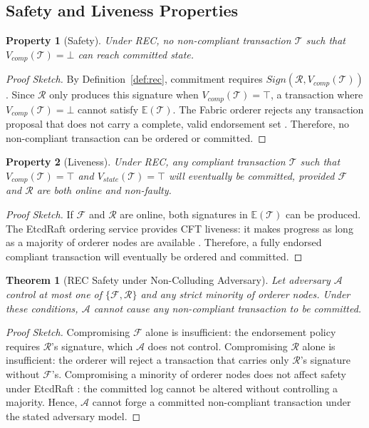 \documentclass[journal,10pt,twocolumn]{IEEEtran}
\newtheorem{theorem}{Theorem}
\newtheorem{property}{Property}
\begin{document}
\subsection{Safety and Liveness Properties}

\begin{property}[Safety]
\label{prop:safety}
Under REC, no non-compliant transaction $\mathcal{T}$ such that $V_{comp}(\mathcal{T}) = \bot$ can reach committed state.
\end{property}

\begin{proof}[Proof Sketch]
By Definition~\ref{def:rec}, commitment requires $\textit{Sign}(\mathcal{R}, V_{comp}(\mathcal{T}))$. Since $\mathcal{R}$ only produces this signature when $V_{comp}(\mathcal{T}) = \top$, a transaction where $V_{comp}(\mathcal{T}) = \bot$ cannot satisfy $\mathbb{E}(\mathcal{T})$. The Fabric orderer rejects any transaction proposal that does not carry a complete, valid endorsement set \cite{ref:fabric}. Therefore, no non-compliant transaction can be ordered or committed.
\end{proof}

\begin{property}[Liveness]
\label{prop:liveness}
Under REC, any compliant transaction $\mathcal{T}$ such that $V_{comp}(\mathcal{T}) = \top$ and $V_{state}(\mathcal{T}) = \top$ will eventually be committed, provided $\mathcal{F}$ and $\mathcal{R}$ are both online and non-faulty.
\end{property}

\begin{proof}[Proof Sketch]
If $\mathcal{F}$ and $\mathcal{R}$ are online, both signatures in $\mathbb{E}(\mathcal{T})$ can be produced. The EtcdRaft ordering service provides CFT liveness: it makes progress as long as a majority of orderer nodes are available \cite{ref:raft}. Therefore, a fully endorsed compliant transaction will eventually be ordered and committed.
\end{proof}

\begin{theorem}[REC Safety under Non-Colluding Adversary]
\label{thm:safety}
Let adversary $\mathcal{A}$ control at most one of $\{\mathcal{F}, \mathcal{R}\}$ and any strict minority of orderer nodes. Under these conditions, $\mathcal{A}$ cannot cause any non-compliant transaction to be committed.
\end{theorem}

\begin{proof}[Proof Sketch]
Compromising $\mathcal{F}$ alone is insufficient: the endorsement policy requires $\mathcal{R}$'s signature, which $\mathcal{A}$ does not control. Compromising $\mathcal{R}$ alone is insufficient: the orderer will reject a transaction that carries only $\mathcal{R}$'s signature without $\mathcal{F}$'s. Compromising a minority of orderer nodes does not affect safety under EtcdRaft \cite{ref:raft}: the committed log cannot be altered without controlling a majority. Hence, $\mathcal{A}$ cannot forge a committed non-compliant transaction under the stated adversary model.
\end{proof}
\end{document}
